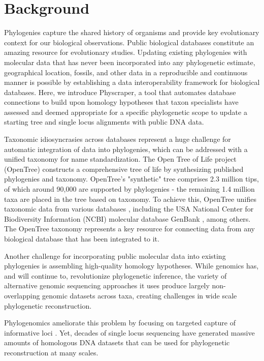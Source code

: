 \documentclass{bmcart}
\begin{document}

\section*{Background}
Phylogenies capture the shared history of organisms and provide key evolutionary
context for our biological observations.
Public biological databases constitute an amazing resource for evolutionary
studies. Updating existing phylogenies with molecular data that has never been
incorporated into any phylogenetic estimate, geographical location, fossils, and
other data in a reproducible and continuous manner is possible by establishing a
data interoperability framework for biological databases. Here, we introduce
Physcraper, a tool that automates database connections to build upon homology
hypotheses that taxon specialists have assessed and deemed appropriate for a
specific phylogenetic scope to update a starting tree and single locus alignments
with public DNA data.

Taxonomic idiosyncrasies across databases represent a huge challenge for automatic
integration of data into phylogenies, which can be addressed with a unified
taxonomy for name standardization. The Open Tree of Life project (OpenTree)
constructs a comprehensive tree of life by synthesizing published phylogenies
and taxonomy. OpenTree's "synthetic" tree comprises 2.3 million tips, of which
around 90,000 are supported by phylogenies - the remaining 1.4 million taxa are
placed in the tree based on taxonomy. To achieve this, OpenTree unifies taxonomic
data from various databases \cite{rees2017automated}, including the USA National
Center for Biodiversity Information (NCBI) molecular database GenBank
\cite{benson2000genbank}, among others. The OpenTree taxonomy represents a key resource
for connecting data from any biological database that has been integrated to it.

Another challenge for incorporating public molecular data into existing phylogenies
is assembling high-quality homology hypotheses.
While genomics has, and will continue to, revolutionize phylogenetic inference,
the variety of alternative genomic sequencing approaches it uses produce largely
non-overlapping genomic datasets across taxa, creating challenges in wide scale
phylogenetic reconstruction.

Phylogenomics ameliorate this problem by focusing on targeted capture of informative
loci \cite{andermann2020guide}. Yet, decades of single locus sequencing have generated
massive amounts of homologous DNA datasets that can be used for phylogenetic
reconstruction at many scales.
\end{document}
